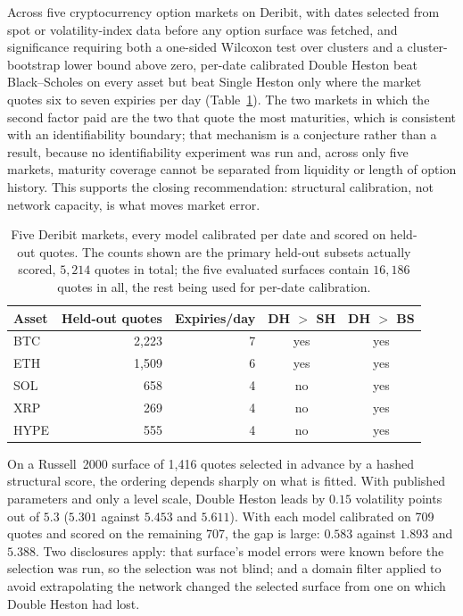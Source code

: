 \documentclass[conference]{IEEEtran}
\begin{document}
Across five cryptocurrency option markets on Deribit, with dates selected from
spot or volatility-index data before any option surface was fetched, and
significance requiring both a one-sided Wilcoxon test over clusters and a
cluster-bootstrap lower bound above zero, per-date calibrated Double Heston
beat Black--Scholes on every asset but beat Single Heston only where the market
quotes six to seven expiries per day (Table~\ref{tab:crypto}). The two markets
in which the second factor paid are the two that quote the most maturities,
which is consistent with an identifiability boundary; that mechanism is a
conjecture rather than a result, because no identifiability experiment was run
and, across only five markets, maturity coverage cannot be separated from
liquidity or length of option history. This supports the
closing recommendation: structural calibration, not network capacity, is what
moves market error.

\begin{table}[!t]
\centering
\caption{Five Deribit markets, every model calibrated per date and scored on
held-out quotes. The counts shown are the primary held-out subsets actually
scored, $5{,}214$ quotes in total; the five evaluated surfaces contain
$16{,}186$ quotes in all, the rest being used for per-date calibration.}
\label{tab:crypto}
\begin{tabular}{lrrcc}
\toprule
Asset & Held-out quotes & Expiries/day & DH $>$ SH & DH $>$ BS \\
\midrule
BTC & 2{,}223 & 7 & yes & yes \\
ETH & 1{,}509 & 6 & yes & yes \\
SOL & 658 & 4 & no & yes \\
XRP & 269 & 4 & no & yes \\
HYPE & 555 & 4 & no & yes \\
\bottomrule
\end{tabular}
\end{table}

On a Russell~2000 surface of 1,416 quotes selected in advance by a hashed
structural score, the ordering depends sharply on what is fitted. With
published parameters and only a level scale, Double Heston leads by $0.15$
volatility points out of $5.3$ ($5.301$ against $5.453$ and $5.611$). With each
model calibrated on 709 quotes and scored on the remaining 707, the gap is
large: $0.583$ against $1.893$ and $5.388$. Two disclosures apply: that
surface's model errors were known before the selection was run, so the
selection was not blind; and a domain filter applied to avoid extrapolating the
network changed the selected surface from one on which Double Heston had lost.
\end{document}
